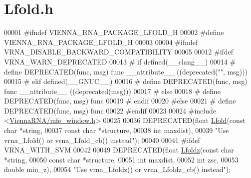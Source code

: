 \hypertarget{Lfold_8h_source}{}\section{Lfold.\+h}
\label{Lfold_8h_source}

\begin{DoxyCode}
00001 \textcolor{preprocessor}{#ifndef VIENNA\_RNA\_PACKAGE\_LFOLD\_H}
00002 \textcolor{preprocessor}{#define VIENNA\_RNA\_PACKAGE\_LFOLD\_H}
00003 
00004 \textcolor{preprocessor}{#ifndef VRNA\_DISABLE\_BACKWARD\_COMPATIBILITY}
00005 
00012 \textcolor{preprocessor}{#ifdef VRNA\_WARN\_DEPRECATED}
00013 \textcolor{preprocessor}{# if defined(\_\_clang\_\_)}
00014 \textcolor{preprocessor}{#  define DEPRECATED(func, msg) func \_\_attribute\_\_ ((deprecated("", msg)))}
00015 \textcolor{preprocessor}{# elif defined(\_\_GNUC\_\_)}
00016 \textcolor{preprocessor}{#  define DEPRECATED(func, msg) func \_\_attribute\_\_ ((deprecated(msg)))}
00017 \textcolor{preprocessor}{# else}
00018 \textcolor{preprocessor}{#  define DEPRECATED(func, msg) func}
00019 \textcolor{preprocessor}{# endif}
00020 \textcolor{preprocessor}{#else}
00021 \textcolor{preprocessor}{# define DEPRECATED(func, msg) func}
00022 \textcolor{preprocessor}{#endif}
00023 
00024 \textcolor{preprocessor}{#include <\hyperlink{mfe__window_8h}{ViennaRNA/mfe\_window.h}>}
00025 
00036 DEPRECATED(\textcolor{keywordtype}{float} \hyperlink{group__mfe__window__deprecated_gafdd1e11b5c7ad443b9f86b818e67bab4}{Lfold}(\textcolor{keyword}{const} \textcolor{keywordtype}{char} *\textcolor{keywordtype}{string},
00037                        \textcolor{keyword}{const} \textcolor{keywordtype}{char} *structure,
00038                        \textcolor{keywordtype}{int}        maxdist),
00039            \textcolor{stringliteral}{"Use vrna\_Lfold() or vrna\_Lfold\_cb() instead"});
00040 
00041 \textcolor{preprocessor}{#ifdef VRNA\_WITH\_SVM}
00042 
00049 DEPRECATED(\textcolor{keywordtype}{float} \hyperlink{group__mfe__window__deprecated_ga9b568887c6091a54252729adcb35f6d2}{Lfoldz}(\textcolor{keyword}{const} \textcolor{keywordtype}{char}  *\textcolor{keywordtype}{string},
00050                         \textcolor{keyword}{const} \textcolor{keywordtype}{char}  *structure,
00051                         \textcolor{keywordtype}{int}         maxdist,
00052                         \textcolor{keywordtype}{int}         zsc,
00053                         \textcolor{keywordtype}{double}      min\_z),
00054            \textcolor{stringliteral}{"Use vrna\_Lfoldz() or vrna\_Lfoldz\_cb() instead"});

\end{DoxyCode}
